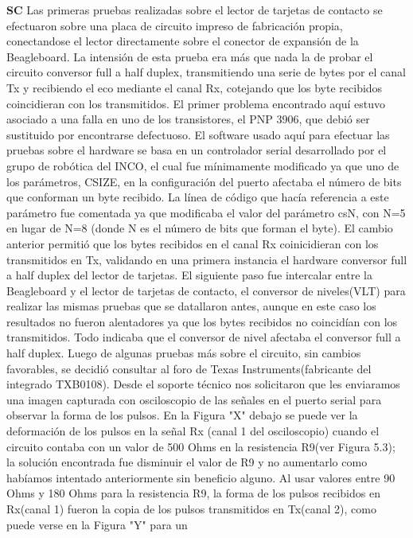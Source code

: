 \bigskip
\bigskip
{\bf{SC}}
\bigskip
Las primeras pruebas realizadas sobre el lector de tarjetas de contacto se efectuaron sobre una
placa de circuito impreso de fabricación propia, conectandose el lector directamente sobre el 
conector de expansión de la Beagleboard. La intensión de esta prueba era más que nada la de probar
el circuito conversor full a half duplex, transmitiendo una serie de bytes por el canal Tx y recibiendo
el eco mediante el canal Rx, cotejando que los byte recibidos coincidieran con los transmitidos. 
El primer problema encontrado aquí estuvo asociado a una falla en uno de los transistores, el PNP 3906, 
que debió ser sustituido por encontrarse defectuoso.
El software usado aquí para efectuar las pruebas sobre el hardware se basa en un controlador serial 
desarrollado por el grupo de robótica del INCO, el cual fue mínimamente modificado ya que uno de los 
parámetros, CSIZE, en la configuración del puerto afectaba el número de bits que conforman un byte recibido. 
La línea de código que hacía referencia a este parámetro fue comentada ya que modificaba el valor del parámetro 
csN, con N=5 en lugar de N=8 (donde N es el número de bits que forman el byte). 
El cambio anterior permitió que los bytes recibidos en el canal Rx coinicidieran con los transmitidos en Tx, 
validando en una primera instancia el hardware conversor full a half duplex del lector de tarjetas.
El siguiente paso fue intercalar entre la Beagleboard y el lector de tarjetas de contacto, el conversor de niveles(VLT)
para realizar las mismas pruebas que se datallaron antes, aunque en este caso los resultados no fueron alentadores
ya que los bytes recibidos no coincidían con los transmitidos. Todo indicaba que el conversor de nivel afectaba
el conversor full a half duplex. Luego de algunas pruebas más sobre el circuito, sin cambios favorables, se
decidió consultar al foro de Texas Instruments(fabricante del integrado TXB0108). Desde el soporte técnico nos solicitaron
que les enviaramos una imagen capturada con osciloscopio de las señales en el puerto serial para observar
la forma de los pulsos. En la Figura "X" debajo se puede ver la deformación de los pulsos en la señal Rx (canal 1
del osciloscopio) cuando el circuito contaba con un valor de 500 Ohms en la resistencia R9(ver Figura 5.3); la
solución encontrada fue disminuir el valor de R9 y no aumentarlo como habíamos intentado anteriormente sin 
beneficio alguno. Al usar valores entre 90 Ohms y 180 Ohms para la resistencia R9, la forma de los pulsos recibidos
en Rx(canal 1) fueron la copia de los pulsos transmitidos en Tx(canal 2), como puede verse en la Figura "Y" para un 
